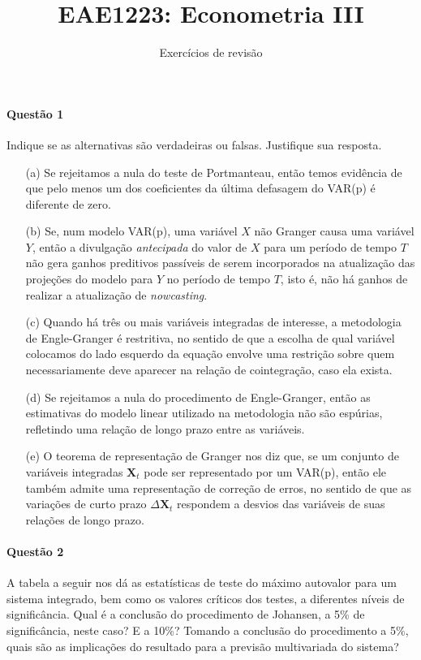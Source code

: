\documentclass[10pt,a4paper]{article}
\title{\large EAE1223: Econometria III}
\author{\normalsize Exercícios de revisão}
\date{}
\begin{document}
	\maketitle
	
	\paragraph{Questão 1} Indique se as alternativas são verdadeiras ou falsas. Justifique sua resposta.
	
	\begin{itemize}
		\item[(a)] Se rejeitamos a nula do teste de Portmanteau, então temos evidência de que pelo menos um dos coeficientes da última defasagem do VAR(p) é diferente de zero.
		\item[(b)] Se, num modelo VAR(p), uma variável $X$ não Granger causa uma variável $Y$, então a divulgação \textit{antecipada} do valor de $X$ para um período de tempo $T$ não gera ganhos preditivos passíveis de serem incorporados na atualização das projeções do modelo para $Y$ no período de tempo $T$, isto é, não há ganhos de realizar a atualização de \textit{nowcasting}.
		\item[(c)] Quando há três ou mais variáveis integradas de interesse, a metodologia de Engle-Granger é restritiva, no sentido de que a escolha de qual variável colocamos do lado esquerdo da equação envolve uma restrição sobre quem necessariamente deve aparecer na relação de cointegração, caso ela exista. 
		\item[(d)] Se rejeitamos a nula do procedimento de Engle-Granger, então as estimativas do modelo linear utilizado na metodologia não são espúrias, refletindo uma relação de longo prazo entre as variáveis.
		\item[(e)] O teorema de representação de Granger nos diz que, se um conjunto de variáveis integradas $\boldsymbol{X}_t$ pode ser representado por um VAR(p), então ele também admite uma representação de correção de erros, no sentido de que as variações de curto prazo $\Delta \boldsymbol{X}_t$ respondem a desvios das variáveis de suas relações de longo prazo.
		
		
	\end{itemize}
	
	
	\paragraph{Questão 2} A tabela a seguir nos dá as estatísticas de teste do máximo autovalor para um sistema integrado, bem como os valores críticos dos testes, a diferentes níveis de significância. Qual é a conclusão do procedimento de Johansen, a 5\% de significância, neste caso? E a 10\%? Tomando a conclusão do procedimento a 5\%, quais são as implicações do resultado para a previsão multivariada do sistema?
	
\end{document}

